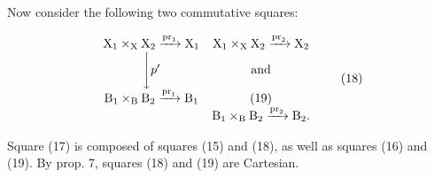 Now consider the following two commutative squares:

\[
\begin{array}{c c} \mathrm{X} _ {1} \times_ {\mathrm{X}} \mathrm{X} _ {2} \xrightarrow {\operatorname{pr} _ {1}} \mathrm{X} _ {1} & \mathrm{X} _ {1} \times_ {\mathrm{X}} \mathrm{X} _ {2} \xrightarrow {\operatorname{pr} _ {2}} \mathrm{X} _ {2} \\ \Biggl \downarrow p ^ {\prime} & \text {and} \\ \mathrm{B} _ {1} \times_ {\mathrm{B}} \mathrm{B} _ {2} \xrightarrow {\operatorname{pr} _ {1}} \mathrm{B} _ {1} & \mathrm{(19)} \\ & \mathrm{B} _ {1} \times_ {\mathrm{B}} \mathrm{B} _ {2} \xrightarrow {\operatorname{pr} _ {2}} \mathrm{B} _ {2}. \end{array}\tag{18}
\]

Square (17) is composed of squares (15) and (18), as well as squares (16) and (19). By prop. 7, squares (18) and (19) are Cartesian.

